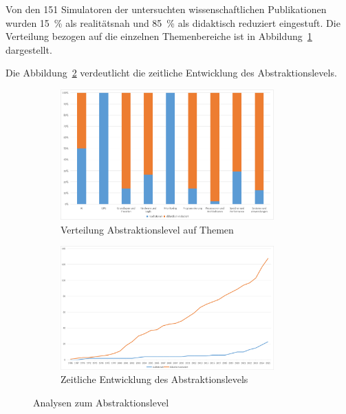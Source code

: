 Von den 151 Simulatoren der untersuchten wissenschaftlichen Publikationen wurden 15~\% als realitätsnah und 85~\% als didaktisch reduziert eingestuft. Die Verteilung bezogen auf die einzelnen Themenbereiche ist in Abbildung~\ref{fig:7-abstraktion-themen} dargestellt.

Die Abbildung~\ref{fig:8-abstraktion-jahr} verdeutlicht die zeitliche Entwicklung des Abstraktionslevels.

\begin{figure}[!htbp]
    \centering
    \begin{subfigure}[b]{0.48\textwidth}
        \centering
        \includegraphics[width=0.90\textwidth]{graphics/7-abtraktion-themen.png}
        \caption{Verteilung Abstraktionslevel auf Themen}
        \label{fig:7-abstraktion-themen}
    \end{subfigure}
    \hfill
    \begin{subfigure}[b]{0.48\textwidth}
        \centering
        \includegraphics[width=0.90\textwidth]{graphics/8-abstraktion-jahr.png}
        \caption{Zeitliche Entwicklung des Abstraktionslevels}
        \label{fig:8-abstraktion-jahr}
    \end{subfigure}
    \caption{Analysen zum Abstraktionslevel}
    \label{fig:abstaktion-analysen}
\end{figure}

